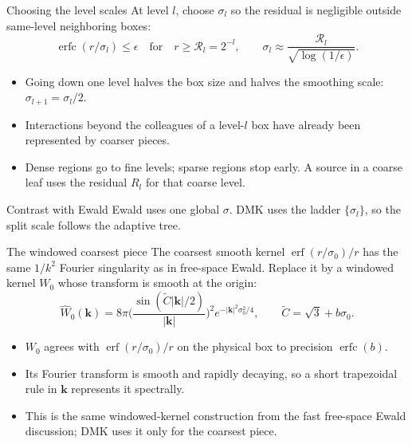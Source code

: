 \documentclass[aspectratio=169,11pt]{beamer}
\newcommand{\cR}{\mathcal{R}}
\newcommand{\kk}{\bm{k}}
\DeclareMathOperator{\erf}{erf}
\DeclareMathOperator{\erfc}{erfc}
\begin{document}
\begin{frame}{Choosing the level scales}
\small
At level \(l\), choose \(\sigma_l\) so the residual is negligible outside
same-level neighboring boxes:
\[
  \erfc(r/\sigma_l)\le\epsilon
  \quad\text{for}\quad r\ge \cR_l=2^{-l},
  \qquad
  \sigma_l\approx \frac{\cR_l}{\sqrt{\log(1/\epsilon)}} .
\]
\begin{itemize}
  \item Going down one level halves the box size and halves the smoothing scale:
  \(\sigma_{l+1}=\sigma_l/2\).
  \item Interactions beyond the colleagues of a level-\(l\) box have already
  been represented by coarser pieces.
  \item Dense regions go to fine levels; sparse regions stop early.  A source
  in a coarse leaf uses the residual \(R_l\) for that coarse level.
\end{itemize}
\begin{block}{Contrast with Ewald}
Ewald uses one global \(\sigma\).  DMK uses the ladder
\(\{\sigma_l\}\), so the split scale follows the adaptive tree.
\end{block}
\end{frame}

\begin{frame}{The windowed coarsest piece}
\small
The coarsest smooth kernel \(\erf(r/\sigma_0)/r\) has the same \(1/k^2\)
Fourier singularity as in free-space Ewald.  Replace it by a windowed kernel
\(W_0\) whose transform is smooth at the origin:
\[
  \widehat W_0(\kk)=8\pi
  \Big(\frac{\sin(\tilde C|\kk|/2)}{|\kk|}\Big)^2
  e^{-|\kk|^2\sigma_0^2/4},
  \qquad \tilde C=\sqrt3+b\sigma_0 .
\]
\begin{itemize}
  \item \(W_0\) agrees with \(\erf(r/\sigma_0)/r\) on the physical box to
  precision \(\erfc(b)\).
  \item Its Fourier transform is smooth and rapidly decaying, so a short
  trapezoidal rule in \(\kk\) represents it spectrally.
  \item This is the same windowed-kernel construction from the fast
  free-space Ewald discussion; DMK uses it only for the coarsest piece.
\end{itemize}
\end{frame}

\end{document}
